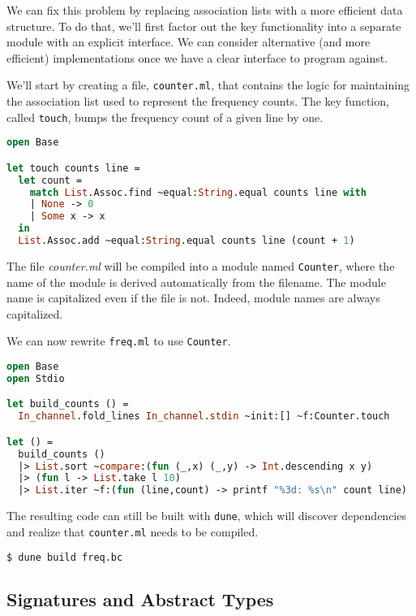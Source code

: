We can fix this problem by replacing association lists with a more
efficient data structure. To do that, we'll first factor out the key
functionality into a separate module with an explicit interface. We can
consider alternative (and more efficient) implementations once we have a
clear interface to program against.

We'll start by creating a file, \passthrough{\lstinline!counter.ml!},
that contains the logic for maintaining the association list used to
represent the frequency counts. The key function, called
\passthrough{\lstinline!touch!}, bumps the frequency count of a given
line by one.

\begin{lstlisting}[language=Caml]
open Base

let touch counts line =
  let count =
    match List.Assoc.find ~equal:String.equal counts line with
    | None -> 0
    | Some x -> x
  in
  List.Assoc.add ~equal:String.equal counts line (count + 1)
\end{lstlisting}

The file \emph{counter.ml} will be compiled into a module named
\passthrough{\lstinline!Counter!}, where the name of the module is
derived automatically from the filename. The module name is capitalized
even if the file is not. Indeed, module names are always capitalized.

We can now rewrite \passthrough{\lstinline!freq.ml!} to use
\passthrough{\lstinline!Counter!}.

\begin{lstlisting}[language=Caml]
open Base
open Stdio

let build_counts () =
  In_channel.fold_lines In_channel.stdin ~init:[] ~f:Counter.touch

let () =
  build_counts ()
  |> List.sort ~compare:(fun (_,x) (_,y) -> Int.descending x y)
  |> (fun l -> List.take l 10)
  |> List.iter ~f:(fun (line,count) -> printf "%3d: %s\n" count line)
\end{lstlisting}

The resulting code can still be built with
\passthrough{\lstinline!dune!}, which will discover dependencies and
realize that \passthrough{\lstinline!counter.ml!} needs to be compiled.

\begin{lstlisting}[language=bash]
$ dune build freq.bc
\end{lstlisting}

\hypertarget{signatures-and-abstract-types}{%
\subsection{Signatures and Abstract
Types}\label{signatures-and-abstract-types}}

